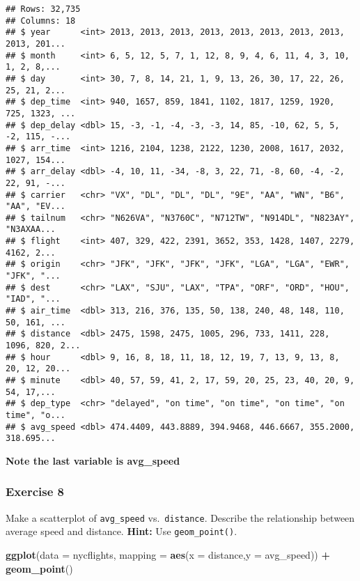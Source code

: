\documentclass[
]{article}
\newenvironment{Shaded}{\begin{snugshade}}{\end{snugshade}}
\newcommand{\DataTypeTok}[1]{\textcolor[rgb]{0.13,0.29,0.53}{#1}}
\newcommand{\KeywordTok}[1]{\textcolor[rgb]{0.13,0.29,0.53}{\textbf{#1}}}
\newcommand{\NormalTok}[1]{#1}
\newcommand{\OperatorTok}[1]{\textcolor[rgb]{0.81,0.36,0.00}{\textbf{#1}}}
\newcommand{\StringTok}[1]{\textcolor[rgb]{0.31,0.60,0.02}{#1}}
\begin{document}
\begin{verbatim}
## Rows: 32,735
## Columns: 18
## $ year      <int> 2013, 2013, 2013, 2013, 2013, 2013, 2013, 2013, 2013, 201...
## $ month     <int> 6, 5, 12, 5, 7, 1, 12, 8, 9, 4, 6, 11, 4, 3, 10, 1, 2, 8,...
## $ day       <int> 30, 7, 8, 14, 21, 1, 9, 13, 26, 30, 17, 22, 26, 25, 21, 2...
## $ dep_time  <int> 940, 1657, 859, 1841, 1102, 1817, 1259, 1920, 725, 1323, ...
## $ dep_delay <dbl> 15, -3, -1, -4, -3, -3, 14, 85, -10, 62, 5, 5, -2, 115, -...
## $ arr_time  <int> 1216, 2104, 1238, 2122, 1230, 2008, 1617, 2032, 1027, 154...
## $ arr_delay <dbl> -4, 10, 11, -34, -8, 3, 22, 71, -8, 60, -4, -2, 22, 91, -...
## $ carrier   <chr> "VX", "DL", "DL", "DL", "9E", "AA", "WN", "B6", "AA", "EV...
## $ tailnum   <chr> "N626VA", "N3760C", "N712TW", "N914DL", "N823AY", "N3AXAA...
## $ flight    <int> 407, 329, 422, 2391, 3652, 353, 1428, 1407, 2279, 4162, 2...
## $ origin    <chr> "JFK", "JFK", "JFK", "JFK", "LGA", "LGA", "EWR", "JFK", "...
## $ dest      <chr> "LAX", "SJU", "LAX", "TPA", "ORF", "ORD", "HOU", "IAD", "...
## $ air_time  <dbl> 313, 216, 376, 135, 50, 138, 240, 48, 148, 110, 50, 161, ...
## $ distance  <dbl> 2475, 1598, 2475, 1005, 296, 733, 1411, 228, 1096, 820, 2...
## $ hour      <dbl> 9, 16, 8, 18, 11, 18, 12, 19, 7, 13, 9, 13, 8, 20, 12, 20...
## $ minute    <dbl> 40, 57, 59, 41, 2, 17, 59, 20, 25, 23, 40, 20, 9, 54, 17,...
## $ dep_type  <chr> "delayed", "on time", "on time", "on time", "on time", "o...
## $ avg_speed <dbl> 474.4409, 443.8889, 394.9468, 446.6667, 355.2000, 318.695...
\end{verbatim}

\textbf{Note the last variable is avg\_speed}

\hypertarget{exercise-8}{%
\subsubsection{Exercise 8}\label{exercise-8}}

Make a scatterplot of \texttt{avg\_speed} vs.~\texttt{distance}.
Describe the relationship between average speed and distance.
\textbf{Hint:} Use \texttt{geom\_point()}.

\begin{Shaded}
\begin{Highlighting}[]
\KeywordTok{ggplot}\NormalTok{(}\DataTypeTok{data =}\NormalTok{ nycflights, }\DataTypeTok{mapping =} \KeywordTok{aes}\NormalTok{(}\DataTypeTok{x =}\NormalTok{ distance,}\DataTypeTok{y =}\NormalTok{ avg_speed)) }\OperatorTok{+}\StringTok{ }\KeywordTok{geom_point}\NormalTok{()}
\end{Highlighting}
\end{Shaded}
\end{document}
